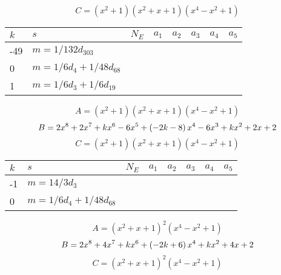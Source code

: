 \documentclass{amsart}
\begin{document}
$$C=(x^2
 + 1)(x^2
 + x
 + 1)(x^4
 - x^2
 + 1)$$
\begin{longtable}{|l|l|l|lllll|}
\hline
$k$ & $s$ & $N_E$ & $a_1$ & $a_2$ & $a_3$ & $a_4$ & $a_5$\\
\hline
-49&$m=1/132d_{303}$&&\multicolumn{5}{c|}{}\\
0&$m=1/6d_{4}+1/48d_{68}$&&\multicolumn{5}{c|}{}\\
1&$m=1/6d_{3}+1/6d_{19}$&&\multicolumn{5}{c|}{}\\
\hline
\end{longtable}
$$A=(x^2
 + 1)(x^2
 + x
 + 1)(x^4
 - x^2
 + 1)$$
$$B=2\*x^8
 + 2\*x^7
 + k\*x^6
 - 6\*x^5
 + \left(-2\*k
 - 8\right) \*x^4
 - 6\*x^3
 + k\*x^2
 + 2\*x
 + 2$$
$$C=(x^2
 + 1)(x^2
 + x
 + 1)(x^4
 - x^2
 + 1)$$
\begin{longtable}{|l|l|l|lllll|}
\hline
$k$ & $s$ & $N_E$ & $a_1$ & $a_2$ & $a_3$ & $a_4$ & $a_5$\\
\hline
-1&$m=14/3d_{3}$&&\multicolumn{5}{c|}{}\\
0&$m=1/6d_{4}+1/48d_{68}$&&\multicolumn{5}{c|}{}\\
\hline
\end{longtable}
$$A=(x^2
 + x
 + 1)^{2}(x^4
 - x^2
 + 1)$$
$$B=2\*x^8
 + 4\*x^7
 + k\*x^6
 + \left(-2\*k
 + 6\right) \*x^4
 + k\*x^2
 + 4\*x
 + 2$$
$$C=(x^2
 + x
 + 1)^{2}(x^4
 - x^2
 + 1)$$
\end{document}
